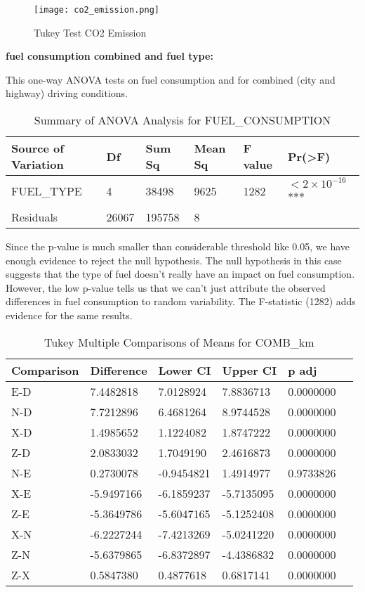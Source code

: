 \documentclass[12pt, a4paper,oneside]{book}
\numberwithin{equation}{section}
\begin{document}
\begin{figure}[H]
\centerline{\texttt{[image: co2\_emission.png]}}
\caption{Tukey Test CO2 Emission}
\label{fig:4.2}
\end{figure}

\textbf{fuel consumption combined and fuel type:}

This one-way ANOVA tests on fuel consumption and for combined (city and highway) driving conditions.

\begin{table}[h]
\centering
\caption{Summary of ANOVA Analysis for FUEL\_CONSUMPTION}
\begin{tabular}{llllll}
\textbf{Source of Variation} & \textbf{Df} & \textbf{Sum Sq} & \textbf{Mean Sq} & \textbf{F value} & \textbf{Pr(>F)} \\
\hline
FUEL\_TYPE & 4 & 38498 & 9625 & 1282 & $<2 \times 10^{-16}$ *** \\
Residuals & 26067 & 195758 & 8 & & \\
\hline
\end{tabular}
\end{table}


Since the p-value is much smaller than considerable threshold like 0.05, we have enough evidence to reject the null hypothesis. The null hypothesis in this case suggests that the type of fuel doesn't really have an impact on fuel consumption. However, the low p-value tells us that we can't just attribute the observed differences in fuel consumption to random variability. The F-statistic (1282) adds evidence for the same results.


\begin{table}[h]
\centering
\caption{Tukey Multiple Comparisons of Means for COMB\_km}
\begin{tabular}{llllll}
\textbf{Comparison} & \textbf{Difference} & \textbf{Lower CI} & \textbf{Upper CI} & \textbf{p adj} \\
\hline
E-D & 7.4482818 & 7.0128924 & 7.8836713 & 0.0000000 \\
N-D & 7.7212896 & 6.4681264 & 8.9744528 & 0.0000000 \\
X-D & 1.4985652 & 1.1224082 & 1.8747222 & 0.0000000 \\
Z-D & 2.0833032 & 1.7049190 & 2.4616873 & 0.0000000 \\
N-E & 0.2730078 & -0.9454821 & 1.4914977 & 0.9733826 \\
X-E & -5.9497166 & -6.1859237 & -5.7135095 & 0.0000000 \\
Z-E & -5.3649786 & -5.6047165 & -5.1252408 & 0.0000000 \\
X-N & -6.2227244 & -7.4213269 & -5.0241220 & 0.0000000 \\
Z-N & -5.6379865 & -6.8372897 & -4.4386832 & 0.0000000 \\
Z-X & 0.5847380 & 0.4877618 & 0.6817141 & 0.0000000 \\
\hline
\end{tabular}
\end{table}
\end{document}
